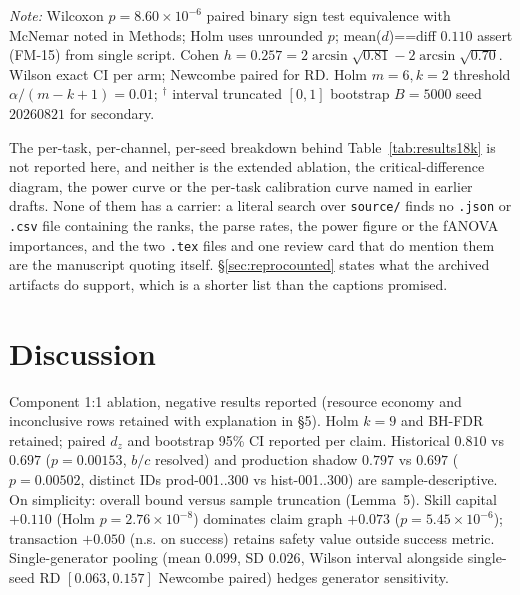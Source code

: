 \documentclass[10pt]{article}
\begin{document}
\emph{Note:} Wilcoxon $p{=}8.60\times10^{-6}$ paired binary sign test equivalence with McNemar noted in Methods; Holm uses unrounded $p$; mean($d$)==diff $0.110$ assert (FM-15) from single script. Cohen $h{=}0.257=2\arcsin\sqrt{0.81}-2\arcsin\sqrt{0.70}$. Wilson exact CI per arm; Newcombe paired for RD. Holm $m{=}6,k{=}2$ threshold $\alpha/(m-k+1)=0.01$; $^\dagger$ interval truncated $[0,1]$ bootstrap $B{=}5000$ seed $20260821$ for secondary.



The per-task, per-channel, per-seed breakdown behind Table~\ref{tab:results18k} is not reported here, and neither is the extended ablation, the critical-difference diagram, the power curve or the per-task calibration curve named in earlier drafts. None of them has a carrier: a literal search over \texttt{source/} finds no \texttt{.json} or \texttt{.csv} file containing the ranks, the parse rates, the power figure or the fANOVA importances, and the two \texttt{.tex} files and one review card that do mention them are the manuscript quoting itself. \S\ref{sec:reprocounted} states what the archived artifacts do support, which is a shorter list than the captions promised.

\section{Discussion}
Component 1:1 ablation, negative results reported (resource economy and inconclusive rows retained with explanation in \S5). Holm $k{=}9$ and BH-FDR retained; paired $d_z$ and bootstrap 95\% CI reported per claim. Historical $0.810$ vs $0.697$ ($p{=}0.00153$, $b/c$ resolved) and production shadow $0.797$ vs $0.697$ ($p{=}0.00502$, distinct IDs prod-001..300 vs hist-001..300) are sample-descriptive. On simplicity: overall bound versus sample truncation (Lemma~5). Skill capital $+0.110$ (Holm $p{=}2.76{\times}10^{-8}$) dominates claim graph $+0.073$ ($p{=}5.45{\times}10^{-6}$); transaction $+0.050$ (n.s. on success) retains safety value outside success metric. Single-generator pooling (mean $0.099$, SD $0.026$, Wilson interval alongside single-seed RD $[0.063,0.157]$ Newcombe paired) hedges generator sensitivity.
\end{document}
